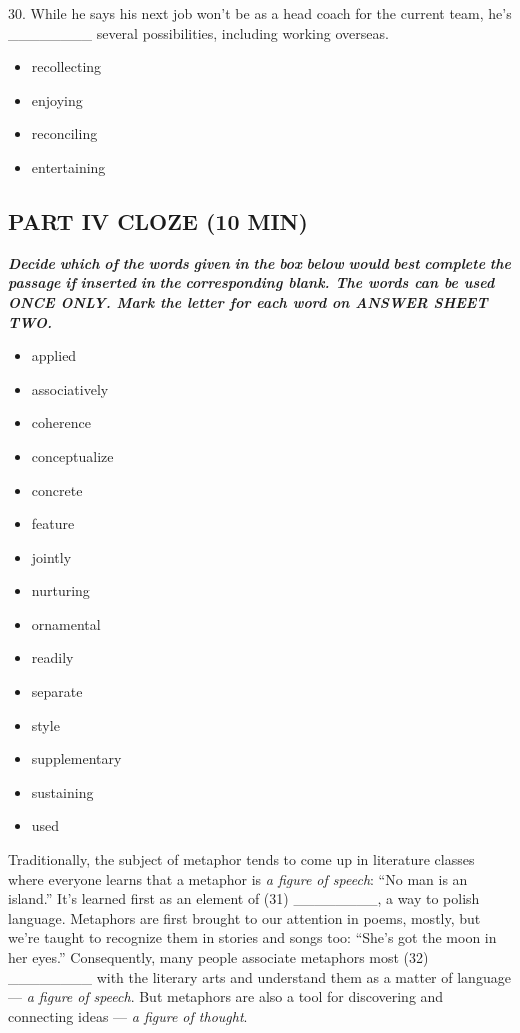 \documentclass[UTF8,11pt]{ctexart}
\begin{document}
30. While he says his next job won’t be as a head coach for the current team, he’s \_\_\_\_\_\_\_\_ several possibilities, including working overseas.


\begin{itemize}[leftmargin=2em,itemsep=.2em,topsep=.4em]\item[A.] recollecting
\item[B.] enjoying
\item[C.] reconciling
\item[D.] entertaining
\end{itemize}

\subsection*{\textbf{PART IV CLOZE} \textbf{(10 MIN)}}


\textbf{\textit{Decide}} \textbf{\textit{which}} \textbf{\textit{of}} \textbf{\textit{the}} \textbf{\textit{words}} \textbf{\textit{given}} \textbf{\textit{in}} \textbf{\textit{the}} \textbf{\textit{box}} \textbf{\textit{below}} \textbf{\textit{would}} \textbf{\textit{best}} \textbf{\textit{complete}} \textbf{\textit{the}} \textbf{\textit{passage}} \textbf{\textit{if}} \textbf{\textit{inserted}} \textbf{\textit{in}} \textbf{\textit{the}} \textbf{\textit{corresponding blank. The words can be used ONCE ONLY. Mark the letter for each word on ANSWER SHEET TWO.}}


\begin{itemize}[leftmargin=2em,itemsep=.2em,topsep=.4em]\item[A.] applied
\item[B.] associatively
\item[C.] coherence
\item[D.] conceptualize
\item[E.] concrete
\item[F.] feature
\item[G.] jointly
\item[H.] nurturing
\item[I.] ornamental
\item[J.] readily
\item[K.] separate
\item[L.] style
\item[M.] supplementary
\item[N.] sustaining
\item[O.] used
\end{itemize}

Traditionally, the subject of metaphor tends to come up in literature classes where everyone learns that a metaphor is \textit{a figure of speech}: “No man is an island.” It’s learned first as an element of (31) \_\_\_\_\_\_\_\_, a way to polish language. Metaphors are first brought to our attention in poems, mostly, but we’re taught to recognize them in stories and songs too: “She’s got the moon in her eyes.” Consequently, many people associate metaphors most (32) \_\_\_\_\_\_\_\_ with the literary arts and understand them as a matter of language — \textit{a figure of} \textit{speech}. But metaphors are also a tool for discovering and connecting ideas — \textit{a figure of thought}.
\end{document}
